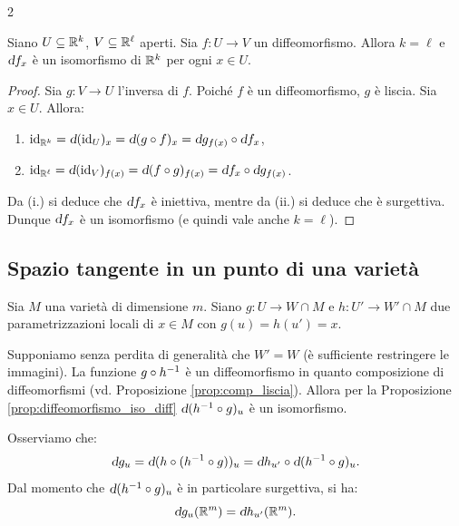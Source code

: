 \begin{multicols*}{2}
    \begin{proposition} \label{prop:diffeomorfismo_iso_diff}
        Siano $U \subseteq \mathbb{R}^k$, $V \subseteq \mathbb{R}^\ell$ aperti. Sia $f : U \to V$ un diffeomorfismo.
        Allora $k = \ell$ e $\dif f_x$ è un isomorfismo di $\mathbb{R}^k$ per ogni $x \in U$.
    \end{proposition}

    \begin{proof}
        Sia $g : V \to U$ l'inversa di $f$. Poiché $f$ è un diffeomorfismo, $g$ è liscia. Sia $x \in U$. Allora:
        \begin{enumerate}[(i.)]
            \item $\id_{\RR^k} = \dif (\id_U)_x = \dif (g \circ f)_x = \dif g_{f(x)} \circ \dif f_x$,
            \item $\id_{\RR^\ell} = \dif (\id_V)_{f(x)} = \dif (f \circ g)_{f(x)} = \dif f_x \circ \dif g_{f(x)}$.
        \end{enumerate}
        Da (i.) si deduce che $\dif f_x$ è iniettiva, mentre da (ii.) si deduce che è surgettiva. Dunque
        $\dif f_x$ è un isomorfismo (e quindi vale anche $k = \ell$).
    \end{proof}

    \subsection{Spazio tangente in un punto di una varietà}

    \begin{remark}
        Sia $M$ una varietà di dimensione $m$. Siano $g : U \to W \cap M$ e
        $h : U' \to W' \cap M$ due parametrizzazioni locali di $x \in M$
        con $g(u) = h(u') = x$. \smallskip

        Supponiamo senza perdita di generalità che $W' = W$ (è sufficiente restringere
        le immagini). La funzione
        $g \circ h^{-1}$ è un diffeomorfismo in quanto composizione di diffeomorfismi
        (vd. Proposizione \ref{prop:comp_liscia}). Allora per la Proposizione \ref{prop:diffeomorfismo_iso_diff}
        $\dif (h\inv \circ g)_u$ è un isomorfismo. \smallskip

        Osserviamo che:
        \[
            \dif g_u = \dif (h \circ (h\inv \circ g))_u = \dif h_{u'} \circ \dif (h\inv \circ g)_u.
        \]
        Dal momento che $\dif (h\inv \circ g)_u$ è in particolare surgettiva, si ha:
        \[
            \dif g_u(\RR^m) = \dif h_{u'}(\RR^m).
        \]
    \end{remark}


\end{multicols*}
